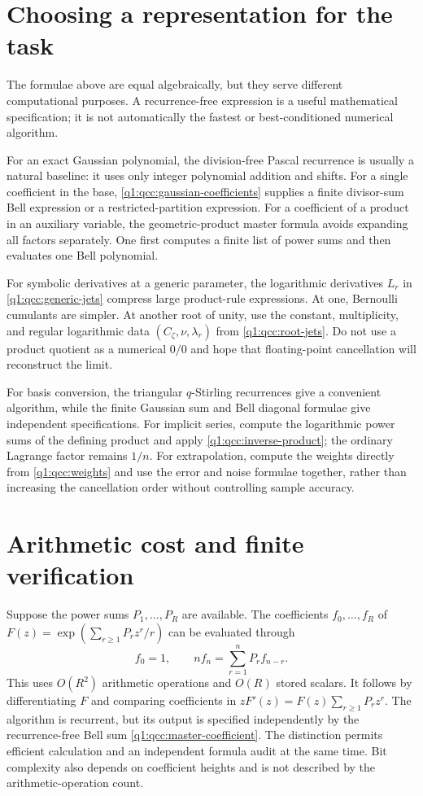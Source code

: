 \documentclass[11pt,a4paper,oneside,openany]{book}
\theoremstyle{definition}
\theoremstyle{remark}
\begin{document}
\section{Choosing a representation for the task}
The formulae above are equal algebraically, but they serve different
computational purposes. A recurrence-free expression is a useful mathematical
specification; it is not automatically the fastest or best-conditioned numerical
algorithm.

For an exact Gaussian polynomial, the division-free Pascal recurrence is usually
a natural baseline: it uses only integer polynomial addition and shifts. For a
single coefficient in the base, \cref{q1:qcc:gaussian-coefficients} supplies a
finite divisor-sum Bell expression or a restricted-partition expression. For a
coefficient of a product in an auxiliary variable, the geometric-product master
formula avoids expanding all factors separately. One first computes a finite
list of power sums and then evaluates one Bell polynomial.

For symbolic derivatives at a generic parameter, the logarithmic derivatives
\(L_r\) in \cref{q1:qcc:generic-jets} compress large product-rule expressions.
At one, Bernoulli cumulants are simpler. At another root of unity, use the
constant, multiplicity, and regular logarithmic data \((C_\zeta,\nu,\lambda_r)\)
from \cref{q1:qcc:root-jets}. Do not use a product quotient as a numerical
\(0/0\) and hope that floating-point cancellation will reconstruct the limit.

For basis conversion, the triangular \(q\)-Stirling recurrences give a
convenient algorithm, while the finite Gaussian sum and Bell diagonal formulae
give independent specifications. For implicit series, compute the logarithmic
power sums of the defining product and apply \cref{q1:qcc:inverse-product}; the
ordinary Lagrange factor remains \(1/n\). For extrapolation, compute the
weights directly from \eqref{q1:qcc:weights} and use the error and noise formulae
together, rather than increasing the cancellation order without controlling
sample accuracy.

\section{Arithmetic cost and finite verification}
Suppose the power sums \(P_1,\ldots,P_R\) are available. The coefficients
\(f_0,\ldots,f_R\) of
\(F(z)=\exp(\sum_{r\ge1}P_rz^r/r)\) can be evaluated through
\begin{equation}\label{q1:qcc:coefficient-algorithm}
 f_0=1,\qquad nf_n=\sum_{r=1}^{n}P_rf_{n-r}.
\end{equation}
This uses \(O(R^2)\) arithmetic operations and \(O(R)\) stored scalars.
It follows by differentiating \(F\) and comparing coefficients in
\(zF'(z)=F(z)\sum_{r\ge1}P_rz^r\). The algorithm is recurrent, but
its output is specified independently by the recurrence-free Bell sum
\eqref{q1:qcc:master-coefficient}. The distinction permits efficient calculation
and an independent formula audit at the same time. Bit complexity also depends
on coefficient heights and is not described by the arithmetic-operation count.
\end{document}
